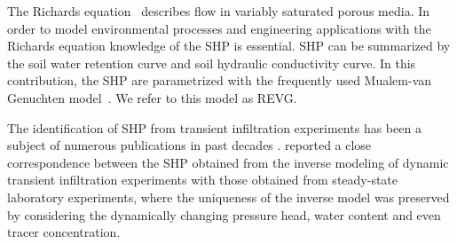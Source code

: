 \documentclass[review,times,3p,10pt]{elsarticle}
\begin{document}
The Richards equation~\citep{richards} describes flow in variably saturated porous media. In order to model environmental processes and engineering applications with the Richards equation knowledge of the SHP is essential. SHP can be summarized by the soil water retention curve and soil hydraulic conductivity curve. In this contribution, the SHP are parametrized with the frequently used Mualem-van Genuchten model~\citep{vangenuchten}. We refer to this model as REVG.







 
The identification of SHP from transient infiltration experiments has been a subject of numerous publications in past decades \citep{simunek-infiltr2shp, infiltr2shp, simunek2-infiltr2shp, XU201234, BAGARELLO201770,  hess-Younes-2017}.  \cite{simunek-infiltr2shp} reported a close correspondence between the SHP obtained from the inverse modeling of dynamic transient infiltration experiments with those obtained from steady-state laboratory experiments, where the uniqueness of the inverse model was preserved by considering the dynamically changing pressure head, water content and even tracer concentration.
\end{document}
